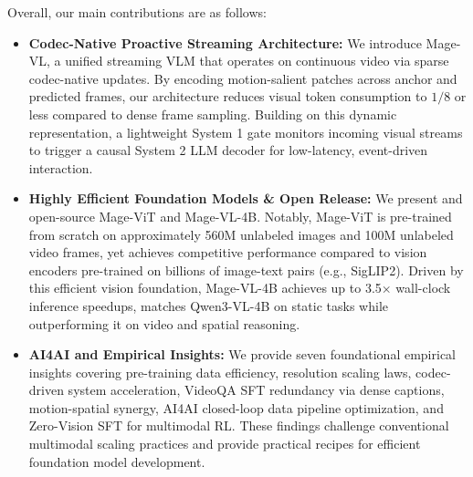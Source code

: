 Overall, our main contributions are as follows:
\begin{itemize}
    \item \textbf{Codec-Native Proactive Streaming Architecture:} We introduce Mage-VL, a unified streaming VLM that operates on continuous video via sparse codec-native updates. By encoding motion-salient patches across anchor and predicted frames, our architecture reduces visual token consumption to $1/8$ or less compared to dense frame sampling. Building on this dynamic representation, a lightweight System 1 gate monitors incoming visual streams to trigger a causal System 2 LLM decoder for low-latency, event-driven interaction.

    \item \textbf{Highly Efficient Foundation Models \& Open Release:} We present and open-source Mage-ViT and Mage-VL-4B. Notably, Mage-ViT is pre-trained from scratch on approximately 560M unlabeled images and 100M unlabeled video frames, yet achieves competitive performance compared to vision encoders pre-trained on billions of image-text pairs (e.g., SigLIP2). Driven by this efficient vision foundation, Mage-VL-4B achieves up to 3.5$\times$ wall-clock inference speedups, matches Qwen3-VL-4B on static tasks while outperforming it on video and spatial reasoning.

    \item \textbf{AI4AI and Empirical Insights:} We provide seven foundational empirical insights covering pre-training data efficiency, resolution scaling laws, codec-driven system acceleration, VideoQA SFT redundancy via dense captions, motion-spatial synergy, AI4AI closed-loop data pipeline optimization, and Zero-Vision SFT for multimodal RL. These findings challenge conventional multimodal scaling practices and provide practical recipes for efficient foundation model development.
\end{itemize}

